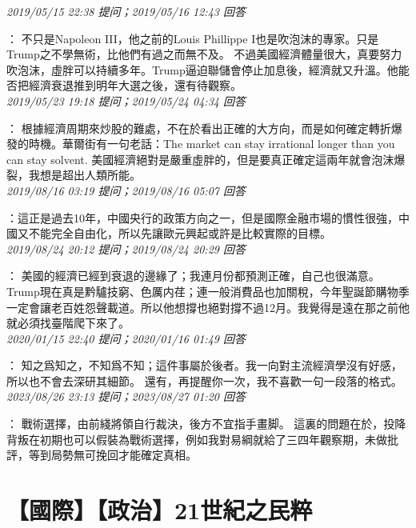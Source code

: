 \documentclass[twocolumn]{ctexart}
\begin{document}
\textit{\hfill\noindent\small 2019/05/15 22:38 提问；2019/05/16 12:43 回答}

：
不只是Napoleon III，他之前的Louis Phillippe I也是吹泡沫的專家。只是Trump之不學無術，比他們有過之而無不及。
不過美國經濟體量很大，真要努力吹泡沫，虛胖可以持續多年。Trump逼迫聯儲會停止加息後，經濟就又升溫。他能否把經濟衰退推到明年大選之後，還有待觀察。
\\

\textit{\hfill\noindent\small 2019/05/23 19:18 提问；2019/05/24 04:34 回答}

：
根據經濟周期來炒股的難處，不在於看出正確的大方向，而是如何確定轉折爆發的時機。華爾街有一句老話：The market can stay irrational longer than you can stay solvent.
美國經濟絕對是嚴重虛胖的，但是要真正確定這兩年就會泡沫爆裂，我想是超出人類所能。
\\

\textit{\hfill\noindent\small 2019/08/16 03:19 提问；2019/08/16 05:07 回答}

：這正是過去10年，中國央行的政策方向之一，但是國際金融市場的慣性很強，中國又不能完全自由化，所以先讓歐元興起或許是比較實際的目標。
\\

\textit{\hfill\noindent\small 2019/08/24 20:12 提问；2019/08/24 20:29 回答}

：
美國的經濟已經到衰退的邊緣了；我連月份都預測正確，自己也很滿意。
Trump現在真是黔驢技窮、色厲内荏；連一般消費品也加關稅，今年聖誕節購物季一定會讓老百姓怨聲載道。所以他想撐也絕對撐不過12月。我覺得是遠在那之前他就必須找臺階爬下來了。
\\

\textit{\hfill\noindent\small 2020/01/15 22:40 提问；2020/01/16 01:49 回答}

：
知之爲知之，不知爲不知；這件事屬於後者。我一向對主流經濟學沒有好感，所以也不會去深研其細節。 
還有，再提醒你一次，我不喜歡一句一段落的格式。
\\

\textit{\hfill\noindent\small 2023/08/26 23:13 提问；2023/08/27 01:20 回答}

：
戰術選擇，由前綫將領自行裁決，後方不宜指手畫脚。
這裏的問題在於，投降背叛在初期也可以假裝為戰術選擇，例如我對易綱就給了三四年觀察期，未做批評，等到局勢無可挽回才能確定真相。
\\


\section{【國際】【政治】21世紀之民粹}
\end{document}
